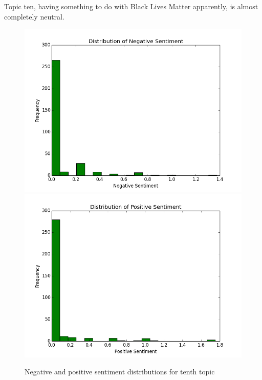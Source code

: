 \documentclass{article}
\begin{document}
\begin{enumerate}
		Topic ten, having something to do with Black Lives Matter apparently, is almost completely neutral.
		
		\begin{figure}[H]
			\includegraphics[scale=0.35]{9neg.png}
			\includegraphics[scale=0.35]{9pos.png}
			\begin{center}
			\caption{Negative and positive sentiment distributions for tenth topic}
			\end{center}
		\end{figure}
		

\end{enumerate}
\end{document}

